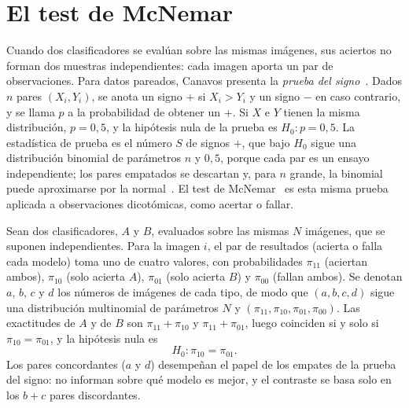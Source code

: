 \section{El test de McNemar}\label{sec:mcnemar}


Cuando dos clasificadores se evalúan sobre las mismas imágenes, sus aciertos no forman dos muestras independientes: cada imagen aporta un par de observaciones. Para datos pareados, Canavos presenta la \emph{prueba del signo}~\cite[sec.~15.3.1]{canavos2003}. Dados $n$ pares $(X_i, Y_i)$, se anota un signo $+$ si $X_i > Y_i$ y un signo $-$ en caso contrario, y se llama $p$ a la probabilidad de obtener un $+$. Si $X$ e $Y$ tienen la misma distribución, $p = 0{,}5$, y la hipótesis nula de la prueba es $H_0\colon p = 0{,}5$. La estadística de prueba es el número $S$ de signos $+$, que bajo $H_0$ sigue una distribución binomial de parámetros $n$ y $0{,}5$, porque cada par es un ensayo independiente; los pares empatados se descartan y, para $n$ grande, la binomial puede aproximarse por la normal~\cite[sec.~15.3.1]{canavos2003}. El test de McNemar~\cite{mcnemar1947} es esta misma prueba aplicada a observaciones dicotómicas, como acertar o fallar.

Sean dos clasificadores, $A$ y $B$, evaluados sobre las mismas $N$ imágenes, que se suponen independientes. Para la imagen $i$, el par de resultados (acierta o falla cada modelo) toma uno de cuatro valores, con probabilidades $\pi_{11}$ (aciertan ambos), $\pi_{10}$ (solo acierta $A$), $\pi_{01}$ (solo acierta $B$) y $\pi_{00}$ (fallan ambos). Se denotan $a$, $b$, $c$ y $d$ los números de imágenes de cada tipo, de modo que $(a, b, c, d)$ sigue una distribución multinomial de parámetros $N$ y $(\pi_{11}, \pi_{10}, \pi_{01}, \pi_{00})$. Las exactitudes de $A$ y de $B$ son $\pi_{11} + \pi_{10}$ y $\pi_{11} + \pi_{01}$, luego coinciden si y solo si $\pi_{10} = \pi_{01}$, y la hipótesis nula es
\[
  H_0\colon \pi_{10} = \pi_{01}.
\]
Los pares concordantes ($a$ y $d$) desempeñan el papel de los empates de la prueba del signo: no informan sobre qué modelo es mejor, y el contraste se basa solo en los $b + c$ pares discordantes.

